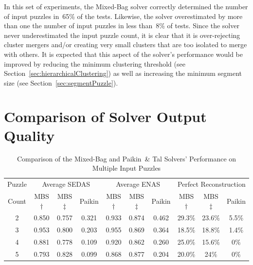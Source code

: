 In this set of experiments, the Mixed-Bag solver correctly determined the number of input puzzles in~65\% of the tests.  Likewise, the solver overestimated by more than one the number of input puzzles in less than~8\% of tests.  Since the solver never underestimated the input puzzle count, it is clear that it is over-rejecting cluster mergers and/or creating very small clusters that are too isolated to merge with others.  It is expected that this aspect of the solver's performance would be improved by reducing the minimum clustering threshold (see Section~\ref{sec:hierarchicalClustering}) as well as increasing the minimum segment size (see Section~\ref{sec:segmentPuzzle}). 

\section{Comparison of Solver Output Quality}\label{sec:comparisonOfSolverOutputQuality}


\begin{table}[tb]
\begin{center}
\begin{tabular}{ c||c|c|c||c|c|c||c|c|c } 
 \toprule
 Puzzle & \multicolumn{3}{c||}{Average SEDAS} & \multicolumn{3}{c||}{Average ENAS} & \multicolumn{3}{c}{Perfect Reconstruction} \\ \cline{2-10}
 Count & MBS$\dagger$ & MBS$\ddagger$ & Paikin & MBS$\dagger$ & MBS$\ddagger$ & Paikin & MBS$\dagger$ & MBS$\ddagger$ & Paikin \\ 
 \hline \hline
 
	2 & 0.850 & 0.757 & 0.321 & 0.933 & 0.874 & 0.462 & 29.3\% & 23.6\% & 5.5\% \\ \hline
 
	3 & 0.953 & 0.800 & 0.203 & 0.955 & 0.869 & 0.364 & 18.5\% & 18.8\% & 1.4\% \\ \hline
  
	4 & 0.881 & 0.778 & 0.109 & 0.920 & 0.862 & 0.260 & 25.0\% & 15.6\% & 0\% \\ \hline
  
	5 & 0.793 & 0.828 & 0.099 & 0.868 & 0.877 & 0.204 & 20.0\% & 24\% & 0\% \\ 
 \bottomrule
\end{tabular}
\end{center}
\caption{Comparison of the Mixed-Bag and Paikin~\& Tal Solvers' Performance on Multiple Input Puzzles}\label{tab:tableSolverPerformanceComparison}
\end{table}

